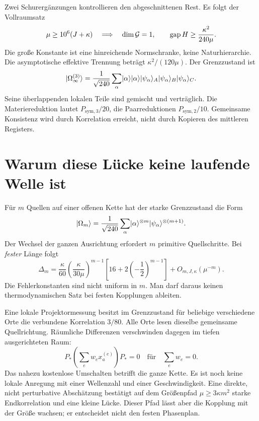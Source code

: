 Zwei Schurergänzungen kontrollieren den abgeschnittenen Rest. Es folgt der Vollraumsatz
\[
 \mu\ge10^6(J+\kappa)\quad\Longrightarrow\quad
 \dim\mathcal G=1,\qquad\operatorname{gap} H\ge\frac{\kappa^2}{240\mu}.
\]
Die große Konstante ist eine hinreichende Normschranke, keine Naturhierarchie. Die asymptotische effektive Trennung beträgt $\kappa^2/(120\mu)$. Der Grenzzustand ist
\[
 \lvert \Omega_\infty^{(3)}\rangle=\frac1{\sqrt{240}}\sum_\alpha
 \lvert \alpha\rangle\lvert \alpha\rangle
 \lvert \psi_\alpha\rangle_A\lvert \psi_\alpha\rangle_B\lvert \psi_\alpha\rangle_C.
\]
Seine überlappenden lokalen Teile sind gemischt und verträglich. Die Materiereduktion lautet $P_{\mathrm{sym},3}/20$, die Paarreduktionen $P_{\mathrm{sym},2}/10$. Gemeinsame Konsistenz wird durch Korrelation erreicht, nicht durch Kopieren des mittleren Registers. 

\section{Warum diese Lücke keine laufende Welle ist}
Für $m$ Quellen auf einer offenen Kette hat der starke Grenzzustand die Form
\[
 \lvert \Omega_m\rangle=\frac1{\sqrt{240}}\sum_\alpha
 \lvert \alpha\rangle^{\otimes m}\lvert \psi_\alpha\rangle^{\otimes(m+1)}.
\]
Der Wechsel der ganzen Ausrichtung erfordert $m$ primitive Quellschritte. Bei \emph{fester} Länge folgt
\[
 \Delta_m=\frac{\kappa}{60}
 \left(\frac{\kappa}{30\mu}\right)^{m-1}
 \left[16+2\left(-\frac12\right)^{m-1}\right]
 +O_{m,J,\kappa}(\mu^{-m}).
\]
Die Fehlerkonstanten sind nicht uniform in $m$. Man darf daraus keinen thermodynamischen Satz bei festen Kopplungen ableiten. 

Eine lokale Projektormessung besitzt im Grenzzustand für beliebige verschiedene Orte die verbundene Korrelation $3/80$. Alle Orte lesen dieselbe gemeinsame Quellrichtung. Räumliche Differenzen verschwinden dagegen im tiefen ausgerichteten Raum:
\[
 P_*\left(\sum_e w_ex_a^{(e)}\right)P_*=0
 \quad\text{für}\quad\sum_e w_e=0.
\]
Das nahezu kostenlose Umschalten betrifft die ganze Kette. Es ist noch keine lokale Anregung mit einer Wellenzahl und einer Geschwindigkeit. Eine direkte, nicht perturbative Abschätzung bestätigt auf dem Größenpfad $\mu\ge3\kappa m^2$ starke Endkorrelation und eine kleine Lücke. Dieser Pfad lässt aber die Kopplung mit der Größe wachsen; er entscheidet nicht den festen Phasenplan. 

